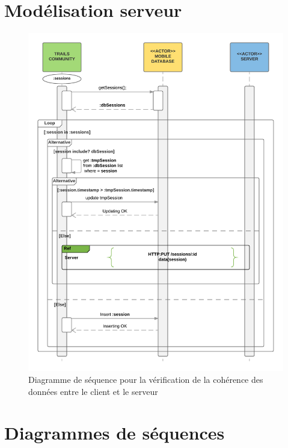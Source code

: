 \documentclass[titlepage, 12pt]{report}
\begin{document}
\chapter{Modélisation serveur}

\begin{figure}[!h]
	\caption{Diagramme de séquence pour la vérification de la cohérence des données entre le client et le serveur}
	\label{check_consitency_data_client_serveur_sequence_diagram}
	\centering
	\includegraphics[scale=0.2]{Images/diagram/check_consistency_data_client_server_sequence_diagram.png}
\end{figure} 

\chapter{Diagrammes de séquences}
\end{document}
